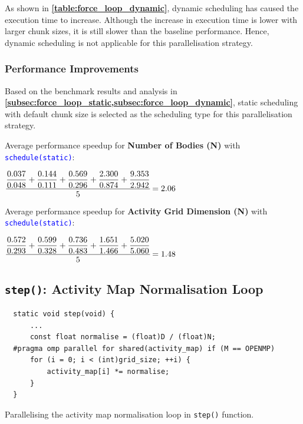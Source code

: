 \documentclass[12pt, a4paper]{article}
\let\oldcref\cref
\renewcommand{\cref}[1]{\textbf{\oldcref{#1}}}
\begin{document}
As shown in \cref{table:force_loop_dynamic}, dynamic scheduling has caused the execution time to
increase. Although the increase in execution time is lower with larger chunk sizes, it is still
slower than the baseline performance. Hence, dynamic scheduling is not applicable for this
parallelisation strategy.

\subsubsection{Performance Improvements}
Based on the benchmark results and analysis in
\cref{subsec:force_loop_static,subsec:force_loop_dynamic}, static scheduling with default chunk size
is selected as the scheduling type for this parallelisation strategy.

\noindent Average performance speedup for \textbf{Number of Bodies (N)} with \textcolor{blue}{\texttt{schedule(static)}}:

\(\cfrac{\dfrac{0.037}{0.048} + \dfrac{0.144}{0.111} + \dfrac{0.569}{0.296} + \dfrac{2.300}{0.874} + \dfrac{9.353}{2.942}}{5} = 2.06\)

\noindent Average performance speedup for \textbf{Activity Grid Dimension (N)} with \textcolor{blue}{\texttt{schedule(static)}}:

\(\cfrac{\dfrac{0.572}{0.293} + \dfrac{0.599}{0.328} + \dfrac{0.736}{0.483} + \dfrac{1.651}{1.466} + \dfrac{5.020}{5.060}}{5} = 1.48\)

\newpage
\subsection{\texttt{step()}: Activity Map Normalisation Loop} \label{subsec:map_loop}
\begin{listing}[H]
  \begin{verbatim}
  static void step(void) {
      ...
      const float normalise = (float)D / (float)N;
  #pragma omp parallel for shared(activity_map) if (M == OPENMP)
      for (i = 0; i < (int)grid_size; ++i) {
          activity_map[i] *= normalise;
      }
  }
  \end{verbatim}
  \caption{Parallelising the activity map normalisation loop in \texttt{step()} function.}
\end{listing}
\end{document}
